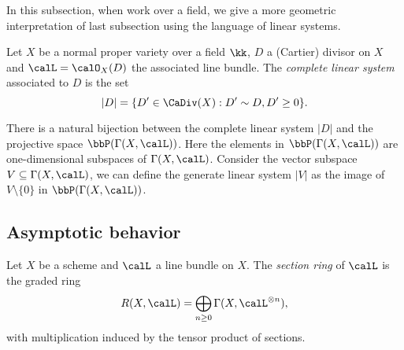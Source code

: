     In this subsection, when work over a field, we give a more geometric interpretation of last subsection using the language of linear systems.

    \begin{definition}\label{def:geometric_complete_linear_system}
        Let \(X\) be a normal proper variety over a field \(\kk\), \(D\) a (Cartier) divisor on \(X\) and \(\calL=\calO_X(D)\) the associated line bundle.
        The \emph{complete linear system} associated to \(D\) is the set 
        \[ |D| = \{D'\in \CaDiv(X) : D'\sim D, D' \geq 0\}. \]
    \end{definition}

    There is a natural bijection between the complete linear system \(|D|\) and the projective space \(\bbP(\Gamma(X,\calL))\).
    Here the elements in \(\bbP(\Gamma(X,\calL))\) are one-dimensional subspaces of \(\Gamma(X,\calL)\).
    Consider the vector subspace \(V\subseteq \Gamma(X,\calL)\), we can define the generate linear system \(|V|\) as the image of \(V\setminus \{0\}\) in \(\bbP(\Gamma(X,\calL))\).




\subsection{Asymptotic behavior}

    \begin{definition}\label{def:section_ring}
        Let \(X\) be a scheme and \(\calL\) a line bundle on \(X\).
        The \emph{section ring} of \(\calL\) is the graded ring
        \[
            R(X,\calL) = \bigoplus_{n\ge 0} \Gamma(X,\calL^{\otimes n}),
        \]
        with multiplication induced by the tensor product of sections.
    \end{definition}

